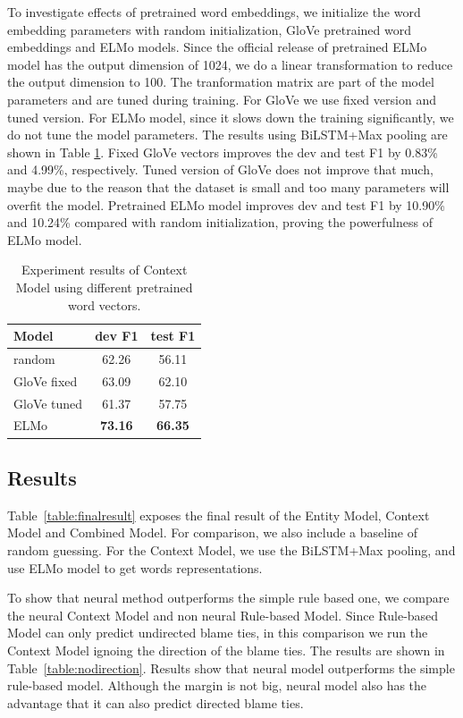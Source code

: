 \documentclass[letterpaper]{article}
\begin{document}
To investigate effects of pretrained word embeddings, we initialize the word embedding parameters with random initialization, GloVe pretrained word embeddings and ELMo models. Since the official release of pretrained ELMo model has the output dimension of 1024, we do a linear transformation to reduce the output dimension to 100. The tranformation matrix are part of the model parameters and are tuned during training. For GloVe we use fixed version and tuned version. For ELMo model, since it slows down the training significantly, we do not tune the model parameters. The results using BiLSTM+Max pooling are shown in Table \ref{table:pretrain}. Fixed GloVe vectors improves the dev and test F1 by 0.83\% and 4.99\%, respectively. Tuned version of GloVe does not improve that much, maybe due to the reason that the dataset is small and too many parameters will overfit the model. Pretrained ELMo model improves dev and test F1 by 10.90\% and 10.24\% compared with random initialization, proving the powerfulness of ELMo model.

\begin{table}[t]
\centering
\begin{tabular}{l c c} 
\hline
{\bf Model}  & {\bf dev F1 } & {\bf test F1 } \\
\hline\hline
random  &  62.26  & 56.11 \\ 
GloVe fixed  & 63.09  & 62.10 \\
GloVe tuned  & 61.37  & 57.75  \\
ELMo  & {\bf 73.16} & {\bf 66.35} \\
\hline
\end{tabular}
\caption{Experiment results of Context Model using different pretrained word vectors.}
\label{table:pretrain}
\end{table}

\subsection{Results}

Table~\ref{table:finalresult} exposes the final result of the Entity Model, Context Model and Combined Model. For comparison, we also include a baseline of random guessing. For the Context Model, we use the BiLSTM+Max pooling, and use ELMo model to get words representations.

To show that neural method outperforms the simple rule based one, we compare the neural Context Model and non neural Rule-based Model. Since Rule-based Model can only predict undirected blame ties, in this comparison we run the Context Model ignoing the direction of the blame ties. The results are shown in Table~\ref{table:nodirection}. Results show that neural model outperforms the simple rule-based model. Although the margin is not big, neural model also has the advantage that it can also predict directed blame ties.
\end{document}

